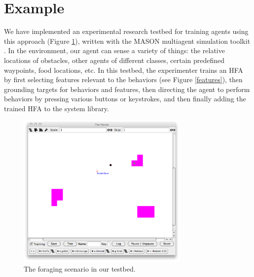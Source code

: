 
\section{Example}

We have implemented an experimental research testbed for training agents using this approach (Figure \ref{horde}), written with the MASON multiagent simulation toolkit \cite{luke:simulation:2005}.
In the environment, our agent can sense a variety of things: the relative locations of obstacles, other agents of different classes, certain predefined waypoints, food locations, etc.  In this testbed, the experimenter trains an HFA by first selecting features relevant to the behaviors (see Figure \ref{features}), then grounding targets for behaviors and features, then directing the agent to perform behaviors by pressing various buttons or keystrokes, and then finally adding the trained HFA to the system library.



\begin{figure}[t]
\begin{center}
\includegraphics[width=3.3in]{ForagingHorde.pdf}
\end{center}
\caption{The foraging scenario in our testbed.}
\label{horde}
\end{figure}



